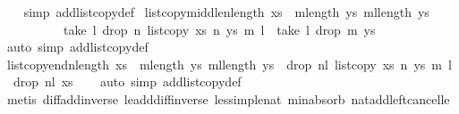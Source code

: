 \begin{isabellebody}
%
\isadelimproof
\ \ %
\endisadelimproof
%
\isatagproof
{}\isamarkupfalse%
\ {\isacharparenleft}simp\ add{\isacharcolon}list{\isacharunderscore}copy{\isacharunderscore}def{\isacharparenright}%
\endisatagproof
{\isafoldproof}%
%
\isadelimproof
\isanewline
%
\endisadelimproof
\isanewline
{}\isamarkupfalse%
\ list{\isacharunderscore}copy{\isacharunderscore}middle{\isacharcolon}{\isachardoublequoteopen}n{\isacharless}length\ xs\ {\isacharampersand}\ m{\isacharless}length\ ys{\isacharampersand}\ {\isacharparenleft}m{\isacharplus}l{\isacharparenright}{\isasymle}length\ ys\ {\isasymLongrightarrow}\ \isanewline
\ \ \ \ \ \ \ \ \ \ take\ l\ {\isacharparenleft}drop\ n\ {\isacharparenleft}list{\isacharunderscore}copy\ xs\ n\ ys\ m\ l{\isacharparenright}{\isacharparenright}\ {\isacharequal}\ take\ l\ {\isacharparenleft}drop\ m\ ys{\isacharparenright}{\isachardoublequoteclose}\isanewline
%
\isadelimproof
\ \ %
\endisadelimproof
%
\isatagproof
{}\isamarkupfalse%
\ {\isacharparenleft}auto\ simp\ add{\isacharcolon}list{\isacharunderscore}copy{\isacharunderscore}def{\isacharparenright}%
\endisatagproof
{\isafoldproof}%
%
\isadelimproof
\isanewline
%
\endisadelimproof
\isanewline
{}\isamarkupfalse%
\ list{\isacharunderscore}copy{\isacharunderscore}end{\isacharcolon}{\isachardoublequoteopen}n{\isacharless}length\ xs\ {\isacharampersand}\ m{\isacharless}length\ ys{\isacharampersand}\ {\isacharparenleft}m{\isacharplus}l{\isacharparenright}{\isasymle}length\ ys\ {\isasymLongrightarrow}\ drop\ {\isacharparenleft}n{\isacharplus}l{\isacharparenright}\ {\isacharparenleft}list{\isacharunderscore}copy\ xs\ n\ ys\ m\ l{\isacharparenright}\ {\isacharequal}\ drop\ {\isacharparenleft}n{\isacharplus}l{\isacharparenright}\ xs{\isachardoublequoteclose}\isanewline
%
\isadelimproof
\ \ %
\endisadelimproof
%
\isatagproof
{}\isamarkupfalse%
\ {\isacharparenleft}auto\ simp\ add{\isacharcolon}list{\isacharunderscore}copy{\isacharunderscore}def{\isacharparenright}\isanewline
\ \ \isamarkupfalse%
\ {\isacharparenleft}metis\ diff{\isacharunderscore}add{\isacharunderscore}inverse{}\ le{\isacharunderscore}add{\isacharunderscore}diff{\isacharunderscore}inverse\ less{\isacharunderscore}imp{\isacharunderscore}le{\isacharunderscore}nat\ min{\isachardot}absorb{}\ nat{\isacharunderscore}add{\isacharunderscore}left{\isacharunderscore}cancel{\isacharunderscore}le{\isacharparenright}\isanewline
\ \ \isamarkupfalse%
%
\endisatagproof
{\isafoldproof}%
%
\isadelimproof
\isanewline

\end{isabellebody}
